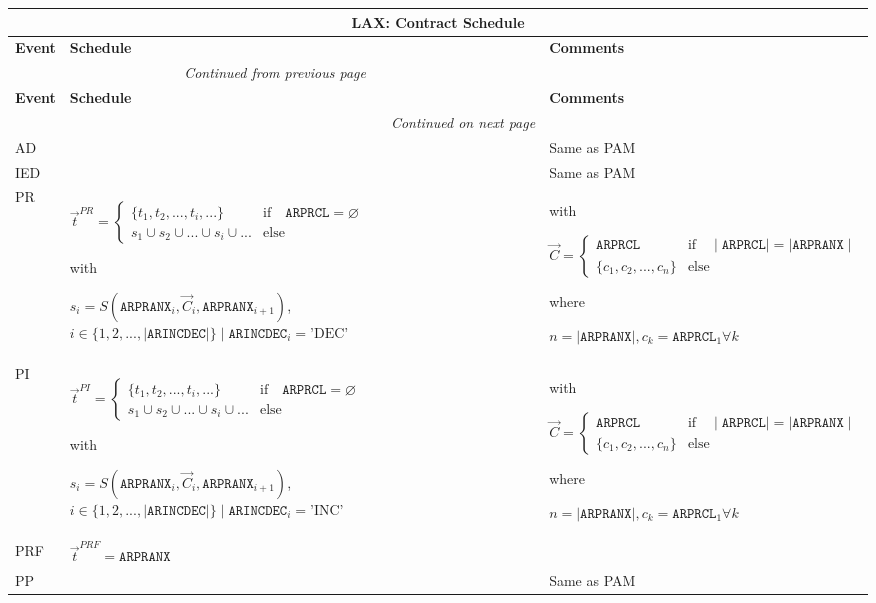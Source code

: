 \documentclass[9pt,oneside]{amsart}
\newenvironment{schedule}[1]{
	\hfill %
	\begin{longtable}{| p{0.05\textwidth} | p{0.5\textwidth} |  p{0.4\textwidth} |}
	\multicolumn{3}{c}{\textbf{#1: Contract Schedule}}\\
	\hline
	\textbf{Event} & \textbf{Schedule} & \textbf{Comments} \\
	\hline
	\endfirsthead
	\multicolumn{2}{c}{\textit{Continued from previous page}} \\
	\hline
	\textbf{Event} & \textbf{Schedule} & \textbf{Comments} \\
	\hline
	\endhead
	\hline \multicolumn{2}{r}{\textit{Continued on next page}} \\
	\endfoot
	\endlastfoot
}{%
	\hline
	\end{longtable}
}
\newcommand{\attr}[1]{\texttt{#1}}
\newcommand{\sdl}[3]{S(#1,#2,#3)}
\newcommand{\undef}{\varnothing}
\begin{document}
\begin{schedule}{LAX}
	AD & & Same as PAM \\
	\hline
	IED & & Same as PAM \\
	\hline
	PR & $\vec{t}^{PR} = \begin{cases} \{ t_1, t_2, ..., t_i, ... \} & \text{if}\quad \attr{ARPRCL}=\undef \\
					s_1 \cup s_2 \cup ... \cup s_i \cup ... & \text{else} \end{cases}$ \par
		with\par
		$s_i=\sdl{\attr{ARPRANX}_i}{\vec{C}_i}{\attr{ARPRANX}_{i+1}}$, $i\in\{1,2,...,\mid\attr{ARINCDEC}\mid\} \mid \attr{ARINCDEC}_i = \text{'DEC'}$
		& with\par $\vec{C} = \begin{cases} \attr{ARPRCL} & \text{if} \quad \mid\attr{ARPRCL}\mid = \mid \attr{ARPRANX}\mid \\
				   \{ c_1, c_2, ..., c_n \}  & \text{else} \end{cases}$ \par
			where\par
			$n=\mid\attr{ARPRANX}\mid, c_k=\attr{ARPRCL}_1\forall k$ \\
	\hline
	PI & $\vec{t}^{PI} = \begin{cases} \{ t_1, t_2, ..., t_i, ... \} & \text{if}\quad \attr{ARPRCL}=\undef \\
					s_1 \cup s_2 \cup ... \cup s_i \cup ... & \text{else} \end{cases}$ \par
		with\par
		$s_i=\sdl{\attr{ARPRANX}_i}{\vec{C}_i}{\attr{ARPRANX}_{i+1}}$, $i\in\{1,2,...,\mid\attr{ARINCDEC}\mid\} \mid \attr{ARINCDEC}_i = \text{'INC'}$
		& with\par $\vec{C} = \begin{cases} \attr{ARPRCL} & \text{if} \quad \mid\attr{ARPRCL}\mid = \mid \attr{ARPRANX}\mid \\
				   \{ c_1, c_2, ..., c_n \}  & \text{else} \end{cases}$ \par
			where\par
			$n=\mid\attr{ARPRANX}\mid, c_k=\attr{ARPRCL}_1\forall k$ \\
	\hline
	PRF & $\vec{t}^{PRF} = \attr{ARPRANX}$ & \\
	\hline
	PP & & Same as PAM \\

\end{schedule}
\end{document}
